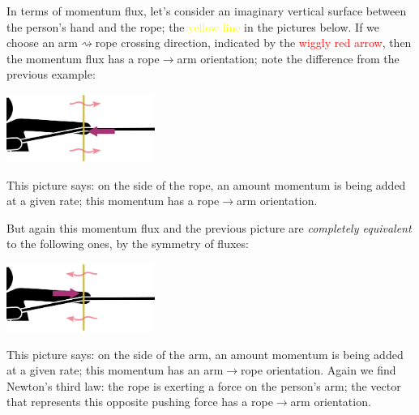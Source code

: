 \documentclass[a4paper,12pt,%
onecolumn,oneside,%
british%
]{memoir}
\renewcommand*{\|}[1][]{\nonscript\:#1\vert\nonscript\:\mathopen{}}
\begin{document}
In terms of momentum flux, let's consider an imaginary vertical surface between the person's hand and the rope; the \textcolor{yellow}{yellow line} in the pictures below. If we choose an arm$\rightsquigarrow$rope crossing direction, indicated by the \textcolor{red}{wiggly red arrow}, then the momentum flux has a rope$\rightarrow$arm orientation; note the difference from the previous example:\noprelistbreak
\begin{center}
  \includegraphics[height=6em]{images/person_pull_flux_right.pdf}
\end{center}
This picture says: on the side of the rope, an amount momentum is being added at a given rate; this momentum has a rope$\rightarrow$arm orientation.

But again this momentum flux and the previous picture are \emph{completely equivalent} to the following ones, by the symmetry of fluxes:\noprelistbreak
\begin{center}
  \includegraphics[height=6em]{images/person_pull_flux_left.pdf}
\end{center}
This picture says: on the side of the arm, an amount momentum is being added at a given rate; this momentum has an arm$\rightarrow$rope orientation. Again we find Newton's third law: the rope is exerting a force on the person's arm; the vector that represents this opposite pushing force has a rope$\to$arm orientation.

\medskip
\end{document}
